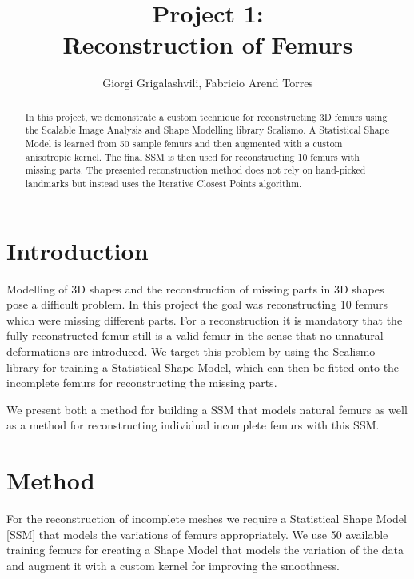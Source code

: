 \documentclass{article}
\begin{document}
	\author{Giorgi Grigalashvili, Fabricio Arend Torres}
		\title{Project 1:\\ Reconstruction of Femurs}
	\maketitle
	\begin{abstract}
		In this project, we demonstrate a custom technique for reconstructing 3D femurs using the Scalable Image Analysis and Shape Modelling library Scalismo. 
		A Statistical Shape Model is learned from 50 sample femurs and then augmented with a custom anisotropic kernel. The final SSM is then used for reconstructing 10 femurs with missing parts. 
		The presented reconstruction method does not rely on hand-picked landmarks but instead uses the Iterative Closest Points algorithm.
	\end{abstract}
	

	\section{Introduction}
	
	Modelling of 3D shapes and the reconstruction of missing parts in 3D shapes pose a difficult problem. In this project the goal was reconstructing 10 femurs which were missing different parts. For a reconstruction it is mandatory that the fully reconstructed femur still is a valid femur in the sense that no unnatural deformations are introduced. We target this problem by using the Scalismo library for training a Statistical Shape Model, which can then be fitted onto the incomplete femurs for reconstructing the missing parts.
	
	We present both a method for building a SSM that models natural femurs as well as a method for reconstructing individual incomplete femurs with this SSM.
	

	\section{Method}
	For the reconstruction of incomplete meshes we require a Statistical Shape Model [SSM] that models the variations of femurs appropriately. We use 50 available training femurs for creating a Shape Model that models the variation of the data and augment it with a custom kernel for improving the smoothness.
	
\end{document}
